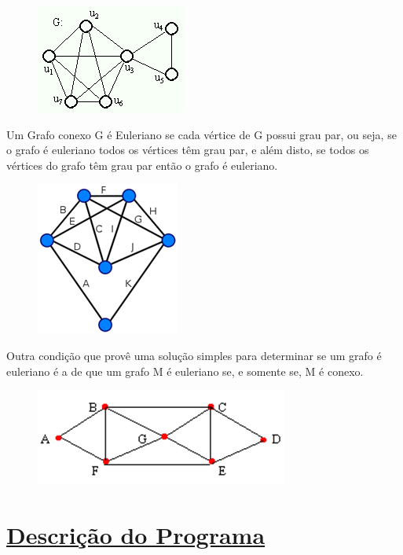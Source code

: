 \documentclass{article}
\begin{document}
\begin{figure}[H]
	\centering
	\includegraphics[width=0.4\linewidth]{"Figuras/img1"}
	\label{fig:img1}
	\caption{}
\end{figure}

	Um Grafo conexo G é Euleriano se cada vértice de G possui grau par, ou seja, se o grafo é euleriano todos os vértices têm grau par, e além disto, se todos os vértices do grafo têm grau par então o grafo é euleriano.
		
\begin{figure}[H]
	\centering
	\includegraphics[width=0.3\linewidth]{"Figuras/img2"}
	\label{fig:img2}
	\caption{}
\end{figure}\vspace*{0.3cm}
	Outra condição que provê uma solução simples para determinar se um grafo é euleriano é a de que um grafo M é euleriano se, e somente se, M é conexo.
	
\begin{figure}[H]
	\centering
	\includegraphics[width=0.5\linewidth]{"Figuras/img3"}
	\label{fig:img3}
	\caption{}
\end{figure}\vspace*{0.2cm}
		
		\section{{\Large \underline{Descrição do Programa}}}\vspace*{0.3cm}
		
\end{document}
